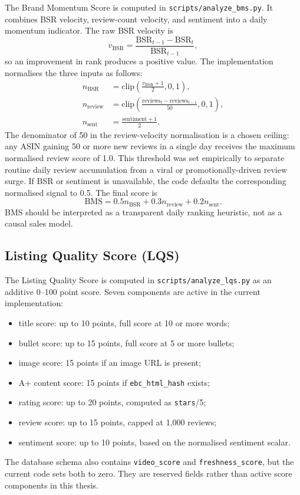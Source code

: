 The Brand Momentum Score is computed in \texttt{scripts/analyze\_bms.py}.
It combines BSR velocity, review-count velocity, and sentiment into a
daily momentum indicator. The raw BSR velocity is
\begin{equation}
    v_{\text{BSR}} = \frac{\text{BSR}_{t-1} - \text{BSR}_{t}}
    {\text{BSR}_{t-1}},
\end{equation}
so an improvement in rank produces a positive value. The implementation
normalises the three inputs as follows:
\begin{align}
    n_{\text{BSR}} &= \text{clip}\left(\frac{v_{\text{BSR}} + 1}{2},0,1\right),\\
    n_{\text{review}} &= \text{clip}\left(\frac{\text{reviews}_{t} - \text{reviews}_{t-1}}{50},0,1\right),\\
    n_{\text{sent}} &= \frac{\text{sentiment}+1}{2}.
\end{align}
The denominator of 50 in the review-velocity normalisation is a chosen
ceiling: any ASIN gaining 50 or more new reviews in a single day receives
the maximum normalised review score of 1.0. This threshold was set
empirically to separate routine daily review accumulation from a viral
or promotionally-driven review surge.
If BSR or sentiment is unavailable, the code defaults the corresponding
normalised signal to 0.5. The final score is
\begin{equation}
    \text{BMS} =
    0.5 n_{\text{BSR}} +
    0.3 n_{\text{review}} +
    0.2 n_{\text{sent}}.
\end{equation}
BMS should be interpreted as a transparent daily ranking heuristic, not
as a causal sales model.

\subsection{Listing Quality Score (LQS)}

The Listing Quality Score is computed in \texttt{scripts/analyze\_lqs.py}
as an additive 0--100 point score. Seven components are active in the
current implementation:
\begin{itemize}
    \item title score: up to 10 points, full score at 10 or more words;
    \item bullet score: up to 15 points, full score at 5 or more bullets;
    \item image score: 15 points if an image URL is present;
    \item A+ content score: 15 points if \texttt{ebc\_html\_hash} exists;
    \item rating score: up to 20 points, computed as \texttt{stars}/5;
    \item review score: up to 15 points, capped at 1,000 reviews;
    \item sentiment score: up to 10 points, based on the normalised sentiment scalar.
\end{itemize}
The database schema also contains \texttt{video\_score} and
\texttt{freshness\_score}, but the current code sets both to zero. They
are reserved fields rather than active score components in this thesis.

